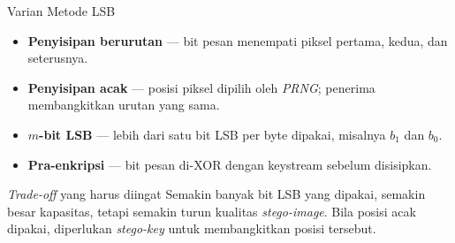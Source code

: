 \documentclass[aspectratio=169,11pt]{beamer}
\begin{document}
\begin{frame}{Varian Metode LSB}
    \begin{itemize}
        \item \textbf{Penyisipan berurutan} --- bit pesan menempati piksel
              pertama, kedua, dan seterusnya.
        \item \textbf{Penyisipan acak} --- posisi piksel dipilih oleh
              \textit{PRNG}; penerima membangkitkan urutan yang sama.
        \item \textbf{$m$-bit LSB} --- lebih dari satu bit LSB per byte
              dipakai, misalnya $b_1$ dan $b_0$.
        \item \textbf{Pra-enkripsi} --- bit pesan di-XOR dengan keystream
              sebelum disisipkan.
    \end{itemize}
    \vspace{0.15cm}
    \begin{alertblock}{\textit{Trade-off} yang harus diingat}
        \footnotesize
        Semakin banyak bit LSB yang dipakai, semakin besar kapasitas, tetapi
        semakin turun kualitas \textit{stego-image}. Bila posisi acak dipakai,
        diperlukan \textit{stego-key} untuk membangkitkan posisi tersebut.
    \end{alertblock}
\end{frame}
\end{document}
